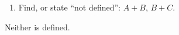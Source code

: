 \documentclass[11pt]{article}
\begin{document}
\begin{enumerate}
\begin{enumerate}
      \item Find, or state ``not defined'': $A+B$, $B+C$. 
    \end{enumerate}

  Neither is defined.

\end{enumerate}
\end{document}
